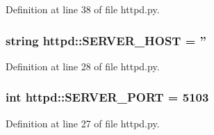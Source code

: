 Definition at line 38 of file httpd.py.

\hypertarget{namespacehttpd_a23df9da5d521d9876f39e179ccb8e056}{
\subsubsection[{SERVER\_\-HOST}]{\setlength{\rightskip}{0pt plus 5cm}string {\bf httpd::SERVER\_\-HOST} = ''}}
\label{namespacehttpd_a23df9da5d521d9876f39e179ccb8e056}


Definition at line 28 of file httpd.py.

\hypertarget{namespacehttpd_adc0117d0e36bf6be6b386f2a2655418c}{
\subsubsection[{SERVER\_\-PORT}]{\setlength{\rightskip}{0pt plus 5cm}int {\bf httpd::SERVER\_\-PORT} = 5103}}
\label{namespacehttpd_adc0117d0e36bf6be6b386f2a2655418c}


Definition at line 27 of file httpd.py.

